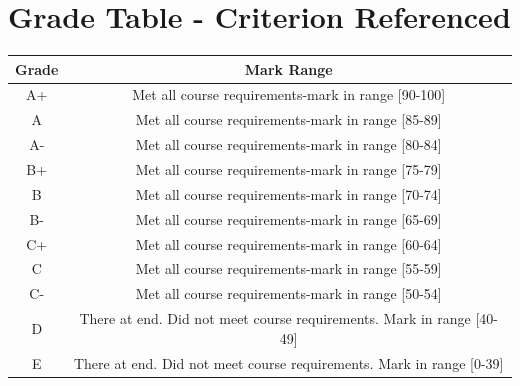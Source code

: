 \documentclass{article}
\begin{document}
\section*{Grade Table - Criterion Referenced}
\renewcommand{\arraystretch}{1.5}
\begin{tabular}{|c|c|}
	\hline
	\textbf{Grade} & \textbf{Mark Range} \\ \hline
	A+             & Met all course requirements-mark in range [90-100]           \\ \hline
	A              & Met all course requirements-mark in range [85-89]              \\ \hline
	A-             & Met all course requirements-mark in range [80-84]             \\ \hline
	B+             & Met all course requirements-mark in range [75-79]             \\ \hline
	B              & Met all course requirements-mark in range [70-74]             \\ \hline
	B-             & Met all course requirements-mark in range [65-69]             \\ \hline
	C+             & Met all course requirements-mark in range [60-64]             \\ \hline
	C              & Met all course requirements-mark in range [55-59]             \\ \hline
	C-             & Met all course requirements-mark in range [50-54]             \\ \hline
	D              & There at end. Did not meet course requirements. Mark in range [40-49]             \\ \hline
	E              & There at end. Did not meet course requirements. Mark in range [0-39]             \\ \hline
\end{tabular} 
\end{document}
